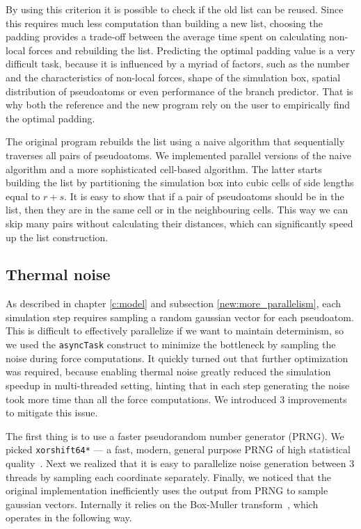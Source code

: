 By using this criterion it is possible to check if the old list can be reused. Since this requires much less computation than building a new list, choosing the padding provides a trade-off between the average time spent on calculating non-local forces and rebuilding the list. Predicting the optimal padding value is a very difficult task, because it is influenced by a myriad of factors, such as the number and the characteristics of non-local forces, shape of the simulation box, spatial distribution of pseudoatoms or even performance of the branch predictor. That is why both the reference and the new program rely on the user to empirically find the optimal padding.

The original program rebuilds the list using a naive algorithm that sequentially traverses all pairs of pseudoatoms. We implemented parallel versions of the naive algorithm and a more sophisticated cell-based algorithm. The latter starts building the list by partitioning the simulation box into cubic cells of side lengths equal to $r + s$. It is easy to show that if a pair of pseudoatoms should be in the list, then they are in the same cell or in the neighbouring cells. This way we can skip many pairs without calculating their distances, which can significantly speed up the list construction.

\subsection{Thermal noise}

As described in chapter \ref{c:model} and subsection \ref{new:more_parallelism}, each simulation step requires sampling a random gaussian vector for each pseudoatom. This is difficult to effectively parallelize if we want to maintain determinism, so we used the \texttt{asyncTask} construct to minimize the bottleneck by sampling the noise during force computations. It quickly turned out that further optimization was required, because enabling thermal noise greatly reduced the simulation speedup in multi-threaded setting, hinting that in each step generating the noise took more time than all the force computations. We introduced 3 improvements to mitigate this issue.

The first thing is to use a faster pseudorandom number generator (PRNG). We picked \texttt{xorshift64*} --- a fast, modern, general purpose PRNG of high statistical quality~\cite{xorshift}. Next we realized that it is easy to parallelize noise generation between 3 threads by sampling each coordinate separately. Finally, we noticed that the original implementation inefficiently uses the output from PRNG to sample gaussian vectors. Internally it relies on the Box-Muller transform~\cite{box-muller}, which operates in the following way.

